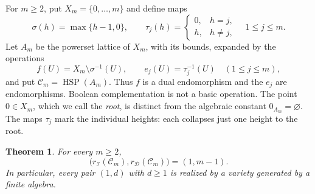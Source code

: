 \documentclass[12pt,english]{amsart}
\newtheorem{theorem}{Theorem}[section]
\theoremstyle{definition}
\numberwithin{equation}{section}
\theoremstyle{remark}
\begin{document}
For $m\geqslant2$, put $X_m=\{0,\ldots,m\}$ and define maps
\[
\sigma(h)=\max\{h-1,0\},\qquad
\tau_j(h)=
\begin{cases}0,&h=j,\\ h,&h\ne j,\end{cases}
\quad 1\leqslant j\leqslant m.
\]
Let $A_m$ be the powerset lattice of $X_m$, with its bounds, expanded
by the operations
\[
f(U)=X_m\setminus\sigma^{-1}(U),\qquad
e_j(U)=\tau_j^{-1}(U)\quad(1\leqslant j\leqslant m),
\]
and put $\mathcal C_m=\operatorname{HSP}(A_m)$. Thus $f$ is a dual
endomorphism and the $e_j$ are endomorphisms. Boolean complementation
is not a basic operation. The point $0\in X_m$, which we call the
\emph{root}, is distinct from the algebraic constant
$0_{A_m}=\varnothing$. The maps $\tau_j$ mark the individual heights:
each collapses just one height to the root.

\begin{theorem}\label{ThmCornishRanks}
For every $m\geqslant2$,
\[
\bigl(r_{\mathcal I}(\mathcal C_m),
      r_{\mathcal D}(\mathcal C_m)\bigr)=(1,m-1).
\]
In particular, every pair $(1,d)$ with $d\geqslant1$ is realized by a
variety generated by a finite algebra.
\end{theorem}
\end{document}
